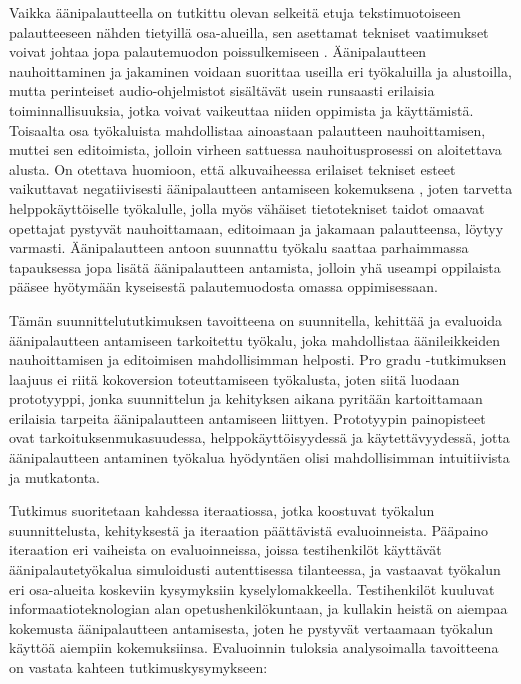\documentclass[utf8]{gradu3}
\begin{document}
Vaikka äänipalautteella on tutkittu olevan selkeitä etuja tekstimuotoiseen palautteeseen nähden tietyillä osa-alueilla, sen asettamat tekniset vaatimukset voivat johtaa jopa palautemuodon poissulkemiseen \parencite{developing}. Äänipalautteen nauhoittaminen ja jakaminen voidaan suorittaa useilla eri työkaluilla ja alustoilla, mutta perinteiset audio-ohjelmistot sisältävät usein runsaasti erilaisia toiminnallisuuksia, jotka voivat vaikeuttaa niiden oppimista ja käyttämistä. Toisaalta osa työkaluista mahdollistaa ainoastaan palautteen nauhoittamisen, muttei sen editoimista, jolloin virheen sattuessa nauhoitusprosessi on aloitettava alusta. On otettava huomioon, että alkuvaiheessa erilaiset tekniset esteet vaikuttavat negatiivisesti äänipalautteen antamiseen kokemuksena \parencite{versus}, joten tarvetta helppokäyttöiselle työkalulle, jolla myös vähäiset tietotekniset taidot omaavat opettajat pystyvät nauhoittamaan, editoimaan ja jakamaan palautteensa, löytyy varmasti. Äänipalautteen antoon suunnattu työkalu saattaa parhaimmassa tapauksessa jopa lisätä äänipalautteen antamista, jolloin yhä useampi oppilaista pääsee hyötymään kyseisestä palautemuodosta omassa oppimisessaan.

Tämän suunnittelututkimuksen tavoitteena on suunnitella, kehittää ja evaluoida äänipalautteen antamiseen tarkoitettu työkalu, joka mahdollistaa äänileikkeiden nauhoittamisen ja editoimisen mahdollisimman helposti. Pro gradu -tutkimuksen laajuus ei riitä kokoversion toteuttamiseen työkalusta, joten siitä luodaan prototyyppi, jonka suunnittelun ja kehityksen aikana pyritään kartoittamaan erilaisia tarpeita äänipalautteen antamiseen liittyen. Prototyypin painopisteet ovat tarkoituksenmukasuudessa, helppokäyttöisyydessä ja käytettävyydessä, jotta äänipalautteen antaminen työkalua hyödyntäen olisi mahdollisimman intuitiivista ja mutkatonta. 

Tutkimus suoritetaan kahdessa iteraatiossa, jotka koostuvat työkalun suunnittelusta, kehityksestä ja iteraation päättävistä evaluoinneista.  Pääpaino iteraation eri vaiheista on evaluoinneissa, joissa testihenkilöt käyttävät äänipalautetyökalua simuloidusti autenttisessa tilanteessa, ja vastaavat työkalun eri osa-alueita koskeviin kysymyksiin kyselylomakkeella. Testihenkilöt kuuluvat informaatioteknologian alan opetushenkilökuntaan, ja kullakin heistä on aiempaa kokemusta äänipalautteen antamisesta, joten he pystyvät vertaamaan työkalun käyttöä aiempiin kokemuksiinsa. Evaluoinnin tuloksia analysoimalla tavoitteena on vastata kahteen tutkimuskysymykseen:
\end{document}
